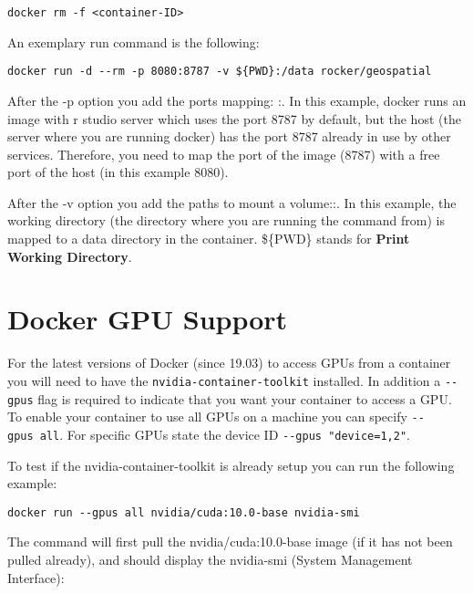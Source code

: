 \documentclass[
]{book}
\begin{document}
\begin{verbatim}
docker rm -f <container-ID>
\end{verbatim}

An exemplary run command is the following:

\begin{verbatim}
docker run -d --rm -p 8080:8787 -v ${PWD}:/data rocker/geospatial
\end{verbatim}

After the -p option you add the ports mapping: :. In this example, docker runs an image with r studio server which uses the port 8787 by default, but the host (the server where you are running docker) has the port 8787 already in use by other services. Therefore, you need to map the port of the image (8787) with a free port of the host (in this example 8080).

After the -v option you add the paths to mount a volume::. In this example, the working directory (the directory where you are running the command from) is mapped to a data directory in the container. \$\{PWD\} stands for \textbf{Print Working Directory}.

\hypertarget{docker-gpu-support}{%
\section{Docker GPU Support}\label{docker-gpu-support}}

For the latest versions of Docker (since 19.03) to access GPUs from a container you will need to have the \texttt{nvidia-container-toolkit} installed. In addition a \texttt{-\/-gpus} flag is required to indicate that you want your container to access a GPU. To enable your container to use all GPUs on a machine you can specify \texttt{-\/-gpus\ all}. For specific GPUs state the device ID \texttt{-\/-gpus\ \textquotesingle{}"device=1,2"\textquotesingle{}}.

To test if the nvidia-container-toolkit is already setup you can run the following example:

\begin{verbatim}
docker run --gpus all nvidia/cuda:10.0-base nvidia-smi
\end{verbatim}

The command will first pull the nvidia/cuda:10.0-base image (if it has not been pulled already), and should display the nvidia-smi (System Management Interface):
\end{document}
